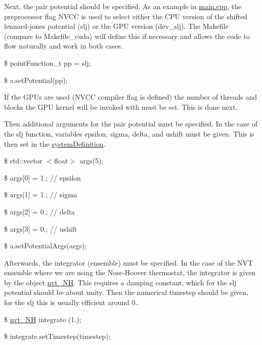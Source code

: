 \begin{DoxyEnumerate}
\item Next, the pair potential should be specified. As an example in \hyperlink{main_8cpp_source}{main.\-cpp}, the preprocessor flag N\-V\-C\-C is used to select either the C\-P\-U version of the shifted lennard-\/jones potential (slj) or the G\-P\-U version (dev\-\_\-slj). The Makefile (compare to Makefile\-\_\-cuda) will define this if necessary and allows the code to flow naturally and work in both cases.

\$ point\-Function\-\_\-t pp = slj;

\$ a.\-set\-Potential(pp);
\end{DoxyEnumerate}


\begin{DoxyEnumerate}
\item If the G\-P\-Us are used (N\-V\-C\-C compiler flag is defined) the number of threads and blocks the G\-P\-U kernel will be invoked with must be set. This is done next.
\end{DoxyEnumerate}


\begin{DoxyEnumerate}
\item Then additional arguments for the pair potential must be specified. In the case of the slj function, variables epsilon, sigma, delta, and ushift must be given. This is then set in the \hyperlink{classsystem_definition}{system\-Definition}.

\$ std\-::vector $<$float$>$ args(5);

\$ args\mbox{[}0\mbox{]} = 1.; // epsilon

\$ args\mbox{[}1\mbox{]} = 1.; // sigma

\$ args\mbox{[}2\mbox{]} = 0.; // delta

\$ args\mbox{[}3\mbox{]} = 0.; // ushift

\$ a.\-set\-Potential\-Args(args);
\end{DoxyEnumerate}


\begin{DoxyEnumerate}
\item Afterwards, the integrator (ensemble) must be specified. In the case of the N\-V\-T ensemble where we are using the Nose-\/\-Hoover thermostat, the integrator is given by the object \hyperlink{classnvt___n_h}{nvt\-\_\-\-N\-H}. This requires a damping constant, which for the slj potential should be about unity. Then the numerical timestep should be given, for the slj this is usually efficient around 0..

\$ \hyperlink{classnvt___n_h}{nvt\-\_\-\-N\-H} integrate (1.);

\$ integrate.\-set\-Timestep(timestep);
\end{DoxyEnumerate}


